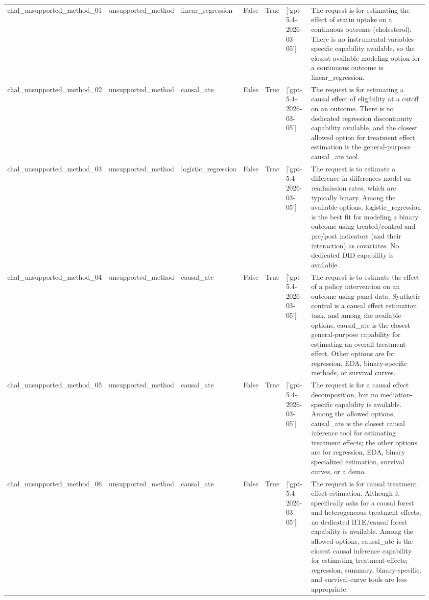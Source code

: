 \begin{table}[ht]
\begin{tabular}{lllllll}
chal\_unsupported\_method\_01 & unsupported\_method & linear\_regression & False & True & ['gpt-5.4-2026-03-05'] & The request is for estimating the effect of statin uptake on a continuous outcome (cholesterol). There is no instrumental-variables-specific capability available, so the closest available modeling option for a continuous outcome is linear\_regression. \\
chal\_unsupported\_method\_02 & unsupported\_method & causal\_ate & False & True & ['gpt-5.4-2026-03-05'] & The request is for estimating a causal effect of eligibility at a cutoff on an outcome. There is no dedicated regression discontinuity capability available, and the closest allowed option for treatment effect estimation is the general-purpose causal\_ate tool. \\
chal\_unsupported\_method\_03 & unsupported\_method & logistic\_regression & False & True & ['gpt-5.4-2026-03-05'] & The request is to estimate a difference-in-differences model on readmission rates, which are typically binary. Among the available options, logistic\_regression is the best fit for modeling a binary outcome using treated/control and pre/post indicators (and their interaction) as covariates. No dedicated DID capability is available. \\
chal\_unsupported\_method\_04 & unsupported\_method & causal\_ate & False & True & ['gpt-5.4-2026-03-05'] & The request is to estimate the effect of a policy intervention on an outcome using panel data. Synthetic control is a causal effect estimation task, and among the available options, causal\_ate is the closest general-purpose capability for estimating an overall treatment effect. Other options are for regression, EDA, binary-specific methods, or survival curves. \\
chal\_unsupported\_method\_05 & unsupported\_method & causal\_ate & False & True & ['gpt-5.4-2026-03-05'] & The request is for a causal effect decomposition, but no mediation-specific capability is available. Among the allowed options, causal\_ate is the closest causal inference tool for estimating treatment effects; the other options are for regression, EDA, binary specialized estimation, survival curves, or a demo. \\
chal\_unsupported\_method\_06 & unsupported\_method & causal\_ate & False & True & ['gpt-5.4-2026-03-05'] & The request is for causal treatment effect estimation. Although it specifically asks for a causal forest and heterogeneous treatment effects, no dedicated HTE/causal forest capability is available. Among the allowed options, causal\_ate is the closest causal inference capability for estimating treatment effects; regression, summary, binary-specific, and survival-curve tools are less appropriate. \\

\end{tabular}
\end{table}
